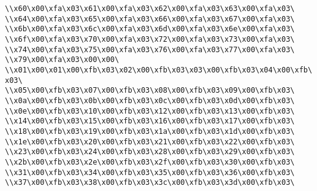 \verb|\\x60\x00\xfa\x03\x61\x00\xfa\x03\x62\x00\xfa\x03\x63\x00\xfa\x03\|\newline
\verb|\\x64\x00\xfa\x03\x65\x00\xfa\x03\x66\x00\xfa\x03\x67\x00\xfa\x03\|\newline
\verb|\\x6b\x00\xfa\x03\x6c\x00\xfa\x03\x6d\x00\xfa\x03\x6e\x00\xfa\x03\|\newline
\verb|\\x6f\x00\xfa\x03\x70\x00\xfa\x03\x72\x00\xfa\x03\x73\x00\xfa\x03\|\newline
\verb|\\x74\x00\xfa\x03\x75\x00\xfa\x03\x76\x00\xfa\x03\x77\x00\xfa\x03\|\newline
\verb|\\x79\x00\xfa\x03\x00\x00\|\newline
\verb|\\x01\x00\x01\x00\xfb\x03\x02\x00\xfb\x03\x03\x00\xfb\x03\x04\x00\xfb\x03\|\newline
\verb|\\x05\x00\xfb\x03\x07\x00\xfb\x03\x08\x00\xfb\x03\x09\x00\xfb\x03\|\newline
\verb|\\x0a\x00\xfb\x03\x0b\x00\xfb\x03\x0c\x00\xfb\x03\x0d\x00\xfb\x03\|\newline
\verb|\\x0e\x00\xfb\x03\x10\x00\xfb\x03\x12\x00\xfb\x03\x13\x00\xfb\x03\|\newline
\verb|\\x14\x00\xfb\x03\x15\x00\xfb\x03\x16\x00\xfb\x03\x17\x00\xfb\x03\|\newline
\verb|\\x18\x00\xfb\x03\x19\x00\xfb\x03\x1a\x00\xfb\x03\x1d\x00\xfb\x03\|\newline
\verb|\\x1e\x00\xfb\x03\x20\x00\xfb\x03\x21\x00\xfb\x03\x22\x00\xfb\x03\|\newline
\verb|\\x23\x00\xfb\x03\x24\x00\xfb\x03\x28\x00\xfb\x03\x29\x00\xfb\x03\|\newline
\verb|\\x2b\x00\xfb\x03\x2e\x00\xfb\x03\x2f\x00\xfb\x03\x30\x00\xfb\x03\|\newline
\verb|\\x31\x00\xfb\x03\x34\x00\xfb\x03\x35\x00\xfb\x03\x36\x00\xfb\x03\|\newline
\verb|\\x37\x00\xfb\x03\x38\x00\xfb\x03\x3c\x00\xfb\x03\x3d\x00\xfb\x03\|\newline
